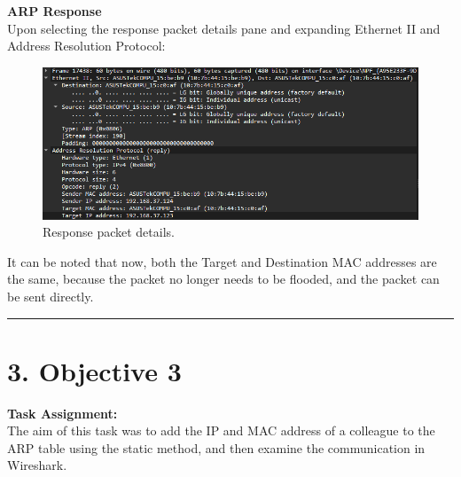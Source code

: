 \documentclass[a4paper,12pt]{article}
\begin{document}
\textbf{ARP Response} \\
Upon selecting the response packet details pane and expanding Ethernet II and Address Resolution Protocol:
\begin{figure}[H]
\centering
\includegraphics[width=\linewidth,keepaspectratio]{Pictures_Lab1/response packet answer ss.png}
\caption{Response packet details.}
\end{figure}

It can be noted that now, both the Target and Destination MAC addresses are the same, because the packet no longer needs to be flooded, and the packet can be sent directly.
\vspace{1em}
\hrule
\section*{3. Objective 3}
\textbf{Task Assignment:} \\
The aim of this task was to add the IP and MAC address of a colleague to the ARP table using the static method, and then examine the communication in Wireshark.
\end{document}
